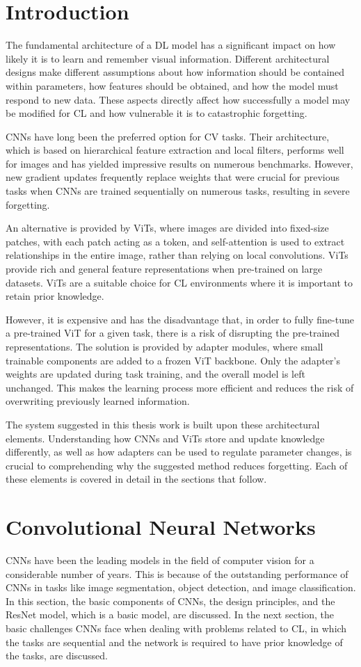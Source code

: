 \documentclass[english, LaM, oneside]{sapthesis}%
\numberwithin{equation}{chapter}
\begin{document}
\section{Introduction}
\label{sec:3.1}
The fundamental architecture of a DL model has a significant impact on how likely it is to learn and remember visual information. Different architectural designs make different assumptions about how information should be contained within parameters, how features should be obtained, and how the model must respond to new data. These aspects directly affect how successfully a model may be modified for CL and how vulnerable it is to catastrophic forgetting.

CNNs have long been the preferred option for CV tasks. Their architecture, which is based on hierarchical feature extraction and local filters, performs well for images and has yielded impressive results on numerous benchmarks. However, new gradient updates frequently replace weights that were crucial for previous tasks when CNNs are trained sequentially on numerous tasks, resulting in severe forgetting.

An alternative is provided by ViTs, where images are divided into fixed-size patches, with each patch acting as a token, and self-attention is used to extract relationships in the entire image, rather than relying on local convolutions. ViTs provide rich and general feature representations when pre-trained on large datasets. ViTs are a suitable choice for CL environments where it is important to retain prior knowledge.

However, it is expensive and has the disadvantage that, in order to fully fine-tune a pre-trained ViT for a given task, there is a risk of disrupting the pre-trained representations. The solution is provided by adapter modules, where small trainable components are added to a frozen ViT backbone. Only the adapter's weights are updated during task training, and the overall model is left unchanged. This makes the learning process more efficient and reduces the risk of overwriting previously learned information.

The system suggested in this thesis work is built upon these architectural elements. Understanding how CNNs and ViTs store and update knowledge differently, as well as how adapters can be used to regulate parameter changes, is crucial to comprehending why the suggested method reduces forgetting. Each of these elements is covered in detail in the sections that follow.

\section{Convolutional Neural Networks}
\label{sec:3.2}
CNNs have been the leading models in the field of computer vision for a considerable number of years. This is because of the outstanding performance of CNNs in tasks like image segmentation, object detection, and image classification. In this section, the basic components of CNNs, the design principles, and the ResNet model, which is a basic model, are discussed. In the next section, the basic challenges CNNs face when dealing with problems related to CL, in which the tasks are sequential and the network is required to have prior knowledge of the tasks, are discussed.
\end{document}
